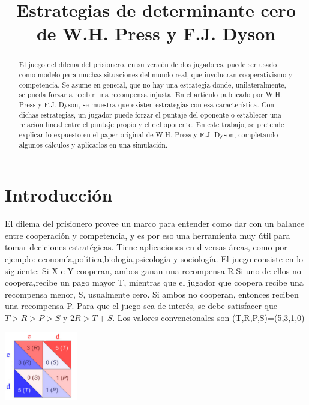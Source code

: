 \documentclass[12pt]{article}
\title{Estrategias de determinante cero de W.H. Press y F.J. Dyson}
\date{}
\begin{document}
\maketitle

\begin{abstract}
El juego del dilema del prisionero, en su versión de dos jugadores, puede ser usado como modelo para 
muchas situaciones del mundo real, que involucran cooperativismo y competencia. Se asume en general, que no hay 
una estrategia donde, unilateralmente, se pueda forzar a recibir una recompensa injusta.\newline
En el artículo publicado por W.H. Press y F.J. Dyson, se muestra que existen estrategias con esa característica.
Con dichas estrategias, un jugador puede forzar el puntaje del oponente o establecer una relacion lineal entre
el puntaje propio y el del oponente.\newline
En este trabajo, se pretende explicar lo expuesto en el paper original de W.H. Press y F.J. Dyson, completando
algunos cálculos y aplicarlos en una simulación.
\end{abstract}




\section{Introducción}
El dilema del prisionero provee un  marco para entender como dar con un balance entre cooperación y competencia, y es
por eso una herramienta muy útil para tomar deciciones estratégicas.
Tiene aplicaciones en diversas áreas, como por ejemplo: economía,política,biología,psicología y sociología.\newline
El juego consiste en lo siguiente:\newline
Si X e Y cooperan, ambos ganan una recompensa R.Si uno de ellos no coopera,recibe un pago mayor T, mientras que el
jugador que coopera recibe una recompensa menor, S, usualmente cero. Si ambos no cooperan, entonces reciben una recompensa P.
Para que el juego sea de interés, se debe satisfacer que $T >  R > P > S$ y $2R > T+S$.
Los valores convencionales son (T,R,P,S)=(5,3,1,0)
\begin{center}
\includegraphics[height=3cm]{./pd.png}
\end{center}
\end{document}
